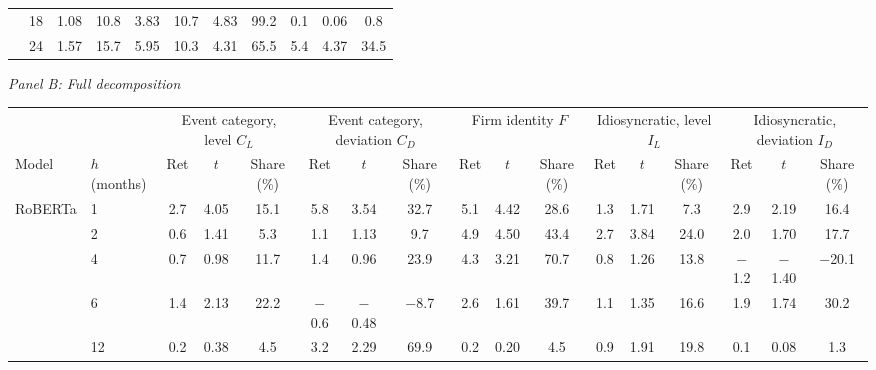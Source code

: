 \begin{table}[htbp]
{\begin{adjustbox}{max width=\linewidth, max totalheight=0.28\textheight}
\begin{tabular}{llccccccccc}
 & 18 & 1.08 & 10.8 & \phantom{0}3.83 & 10.7 & \phantom{0}4.83 & 99.2 & \phantom{$-$}0.1 & \phantom{$-$}0.06 & \phantom{0}0.8 \\
 & 24 & 1.57 & 15.7 & \phantom{0}5.95 & 10.3 & \phantom{0}4.31 & 65.5 & \phantom{$-$}5.4 & \phantom{$-$}4.37 & 34.5 \\
\bottomrule
\end{tabular}
\end{adjustbox}
\par\medskip
\textit{Panel B: Full decomposition}\\[2pt]
\begin{adjustbox}{max width=\linewidth, max totalheight=0.28\textheight}
\begin{tabular}{llccccccccccccccc}
\toprule
\multicolumn{2}{c}{} & \multicolumn{3}{c}{Event category, level $C_L$} & \multicolumn{3}{c}{Event category, deviation $C_D$} & \multicolumn{3}{c}{Firm identity $F$} & \multicolumn{3}{c}{Idiosyncratic, level $I_L$} & \multicolumn{3}{c}{Idiosyncratic, deviation $I_D$} \\
\cmidrule(lr){3-5} \cmidrule(lr){6-8} \cmidrule(lr){9-11} \cmidrule(lr){12-14} \cmidrule(lr){15-17}
Model & $h$ (months) & Ret & $t$ & Share (\%) & Ret & $t$ & Share (\%) & Ret & $t$ & Share (\%) & Ret & $t$ & Share (\%) & Ret & $t$ & Share (\%) \\
\midrule
RoBERTa & 1 & \phantom{$-$}2.7 & \phantom{$-$}4.05 & \phantom{$-$}15.1 & \phantom{$-$}5.8 & \phantom{$-$}3.54 & \phantom{$-$}32.7 & \phantom{0}5.1 & \phantom{0}4.42 & 28.6 & 1.3 & 1.71 & \phantom{0}7.3 & \phantom{$-$}2.9 & \phantom{$-$}2.19 & \phantom{$-$}16.4 \\
 & 2 & \phantom{$-$}0.6 & \phantom{$-$}1.41 & \phantom{$-$0}5.3 & \phantom{$-$}1.1 & \phantom{$-$}1.13 & \phantom{$-$0}9.7 & \phantom{0}4.9 & \phantom{0}4.50 & 43.4 & 2.7 & 3.84 & 24.0 & \phantom{$-$}2.0 & \phantom{$-$}1.70 & \phantom{$-$}17.7 \\
 & 4 & \phantom{$-$}0.7 & \phantom{$-$}0.98 & \phantom{$-$}11.7 & \phantom{$-$}1.4 & \phantom{$-$}0.96 & \phantom{$-$}23.9 & \phantom{0}4.3 & \phantom{0}3.21 & 70.7 & 0.8 & 1.26 & 13.8 & $-$1.2 & $-$1.40 & $-$20.1 \\
 & 6 & \phantom{$-$}1.4 & \phantom{$-$}2.13 & \phantom{$-$}22.2 & $-$0.6 & $-$0.48 & \phantom{0}$-$8.7 & \phantom{0}2.6 & \phantom{0}1.61 & 39.7 & 1.1 & 1.35 & 16.6 & \phantom{$-$}1.9 & \phantom{$-$}1.74 & \phantom{$-$}30.2 \\
 & 12 & \phantom{$-$}0.2 & \phantom{$-$}0.38 & \phantom{$-$0}4.5 & \phantom{$-$}3.2 & \phantom{$-$}2.29 & \phantom{$-$}69.9 & \phantom{0}0.2 & \phantom{0}0.20 & \phantom{0}4.5 & 0.9 & 1.91 & 19.8 & \phantom{$-$}0.1 & \phantom{$-$}0.08 & \phantom{$-$0}1.3 \\

\end{tabular}
\end{adjustbox}}
\end{table}
